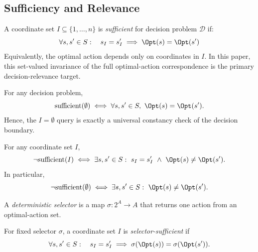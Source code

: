 \subsection{Sufficiency and Relevance}

\begin{definition}\label{def:sufficient}
A coordinate set $I \subseteq \{1, \ldots, n\}$ is \emph{sufficient} for decision problem $\mathcal{D}$ if:
\[
\forall s, s' \in S: \quad s_I = s'_I \implies \Opt(s) = \Opt(s')
\]
Equivalently, the optimal action depends only on coordinates in $I$.
In this paper, this set-valued invariance of the full optimal-action correspondence is the primary decision-relevance target.
\end{definition}

\begin{proposition}\label{prop:empty-sufficient-constant}
For any decision problem,
\[
\text{sufficient}(\emptyset)
\iff
\forall s,s'\in S,\ \Opt(s)=\Opt(s').
\]
Hence, the $I=\emptyset$ query is exactly a universal constancy check of the decision boundary.
\end{proposition}

\begin{proposition}\label{prop:insufficiency-counterexample}
For any coordinate set $I$,
\[
\neg\text{sufficient}(I)
\iff
\exists s,s'\in S:\ s_I=s'_I\ \wedge\ \Opt(s)\neq\Opt(s').
\]
In particular,
\[
\neg\text{sufficient}(\emptyset)
\iff
\exists s,s'\in S:\ \Opt(s)\neq\Opt(s').
\]
\end{proposition}

\begin{definition}\label{def:selector}
A \emph{deterministic selector} is a map $\sigma : 2^A \to A$ that returns one action from an optimal-action set.
\end{definition}

\begin{definition}\label{def:selector-sufficient}
For fixed selector $\sigma$, a coordinate set $I$ is \emph{selector-sufficient} if
\[
\forall s,s' \in S:\quad s_I=s'_I \implies \sigma(\Opt(s))=\sigma(\Opt(s')).
\]
\end{definition}

